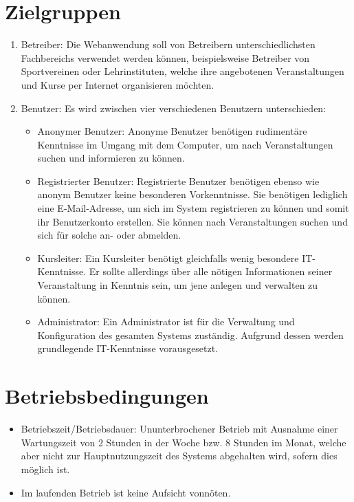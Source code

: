 \documentclass[a4paper]{scrreprt}
\begin{document}
	\section{Zielgruppen}
		 \begin{enumerate}
		 	\item Betreiber: Die Webanwendung soll von Betreibern unterschiedlichsten Fachbereichs verwendet werden können, beispielsweise Betreiber von Sportvereinen oder Lehrinstituten, welche ihre angebotenen Veranstaltungen und Kurse per Internet organisieren möchten.
		 	\item Benutzer: Es wird zwischen vier verschiedenen Benutzern unterschieden:
		 	\begin{itemize}
		 		\item Anonymer Benutzer: Anonyme Benutzer benötigen rudimentäre Kenntnisse im Umgang mit dem Computer, um nach 	Veranstaltungen suchen und informieren zu können.
		 		\item Registrierter Benutzer: Registrierte Benutzer benötigen ebenso wie anonym Benutzer keine besonderen Vorkenntnisse. Sie benötigen lediglich eine E-Mail-Adresse, um sich im System registrieren zu können und somit ihr Benutzerkonto erstellen. Sie können nach Veranstaltungen suchen und sich für solche an- oder abmelden.
		 		\item Kursleiter: Ein Kursleiter benötigt gleichfalls wenig besondere IT-Kenntnisse. Er sollte allerdings über alle nötigen Informationen seiner Veranstaltung in Kenntnis sein, um jene anlegen und verwalten zu können.
		 		\item Administrator: Ein Administrator ist für die Verwaltung und \gls{Konfiguration} des gesamten Systems zuständig. Aufgrund dessen werden grundlegende IT-Kenntnisse vorausgesetzt.
		 	\end{itemize}	
		 \end{enumerate}  
        
    
	\section{Betriebsbedingungen}
	       \begin{itemize}
		       	\item Betriebszeit/Betriebsdauer: Ununterbrochener Betrieb mit Ausnahme einer Wartungszeit von 2 Stunden in der Woche bzw. 8 Stunden im Monat, welche aber nicht zur Hauptnutzungszeit des Systems abgehalten wird, sofern dies möglich ist.
		       	\item  Im laufenden Betrieb ist keine Aufsicht vonnöten.
	       \end{itemize}
	
\end{document}
